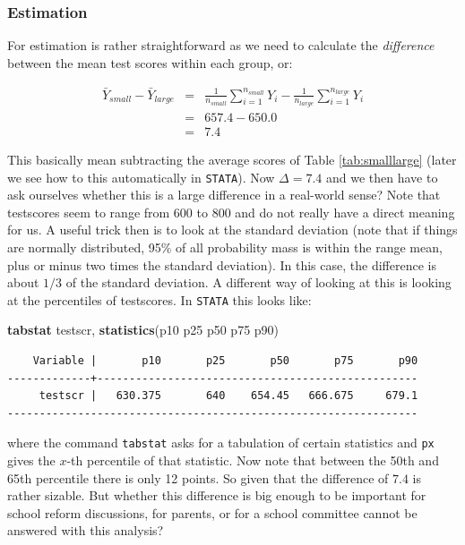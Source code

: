 \documentclass[
]{book}
\newenvironment{Shaded}{\begin{snugshade}}{\end{snugshade}}
\newcommand{\KeywordTok}[1]{\textcolor[rgb]{0.13,0.29,0.53}{\textbf{#1}}}
\newcommand{\NormalTok}[1]{#1}
\begin{document}
\hypertarget{estimation}{%
\subsubsection{Estimation}\label{estimation}}

For estimation is rather straightforward as we need to calculate the \emph{difference} between the mean test scores within each group, or:

\begin{eqnarray}
\bar{Y}_{small} - \bar{Y}_{large} &=& \frac{1}{n_{small}} \sum_{i=1}^{n_{small}}Y_i - \frac{1}{n_{large}} \sum_{i=1}^{n_{large}} Y_i \\
&=& 657.4-650.0\\
&=&7.4
\label{eq:estimationlarge}
\end{eqnarray}

This basically mean subtracting the average scores of Table \ref{tab:smalllarge} (later we see how to this automatically in \texttt{STATA}). Now \(\Delta = 7.4\) and we then have to ask ourselves whether this is a large difference in a real-world sense? Note that testscores seem to range from 600 to 800 and do not really have a direct meaning for us. A useful trick then is to look at the standard deviation (note that if things are normally distributed, 95\% of all probability mass is within the range mean, plus or minus two times the standard deviation). In this case, the difference is about \(1/3\) of the standard deviation. A different way of looking at this is looking at the percentiles of testscores. In \texttt{STATA} this looks like:

\begin{Shaded}
\begin{Highlighting}[]
\KeywordTok{tabstat}\NormalTok{ testscr, }\KeywordTok{statistics}\NormalTok{(p10 p25 p50 p75 p90)}
\end{Highlighting}
\end{Shaded}

\begin{verbatim}
    Variable |       p10       p25       p50       p75       p90
-------------+--------------------------------------------------
     testscr |   630.375       640    654.45   666.675     679.1
----------------------------------------------------------------
\end{verbatim}

where the command \texttt{tabstat} asks for a tabulation of certain statistics and \texttt{px} gives the \(x\)-th percentile of that statistic. Now note that between the 50th and 65th percentile there is only 12 points. So given that the difference of \(7.4\) is rather sizable. But whether this difference is big enough to be important for school reform discussions, for parents, or for a school committee cannot be answered with this analysis?
\end{document}

